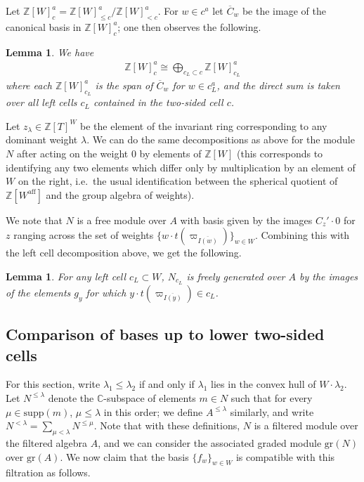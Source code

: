 \documentclass{amsart}
\newtheorem{lemma}[thm]{Lemma}
\theoremstyle{definition}
\begin{document}
Let $\mathbb{Z}[W]_{c}^a = \mathbb{Z}[W]_{\leq c}^a/\mathbb{Z}[W]_{< c}^a$. For $w \in c^a$ let $\overline{C}_w$ be the image of the canonical basis in $\mathbb{Z}[W]^a_c$; one then observes the following.

\begin{lemma}\label{lem:leftcell}
    We have
    \begin{align}
        \mathbb{Z}[W]_{c}^a \cong \bigoplus_{c_L \subset c} \mathbb{Z}[W]_{c_L}^a
    \end{align}
    where each $\mathbb{Z}[W]^a_{c_L}$ is the span of $\overline{C}_w$ for $w \in c_L^a$, and the direct sum is taken over all left cells $c_L$ contained in the two-sided cell $c$.
\end{lemma}

Let $z_{\lambda} \in \mathbb{Z}[T]^W$ be the element of the invariant ring corresponding to any dominant weight $\lambda$. We can do the same decompositions as above for the module $N$ after acting on the weight $0$ by elements of $\mathbb{Z}[W]$ (this corresponds to identifying any two elements which differ only by multiplication by an element of $W$ on the right, i.e.\ the usual identification between the spherical quotient of $\mathbb{Z}[W^{\mathrm{aff}}]$ and the group algebra of weights).

We note that $N$ is a free module over $A$ with basis given by the images $C_z' \cdot 0$ for $z$ ranging across the set of weights $\{w \cdot t(\varpi_{\overline{I(w)}})\}_{w \in W}$. Combining this with the left cell decomposition above, we get the following.
\begin{lemma}\label{lem:thetas}
    For any left cell $c_L \subset W$, $N_{c_L}$ is freely generated over $A$ by the images of the elements $g_y$ for which $y \cdot t(\varpi_{\overline{I(y)}}) \in c_L$. 
\end{lemma}

\subsection{Comparison of bases up to lower two-sided cells}
For this section, write $\lambda_1 \leq \lambda_2$ if and only if $\lambda_1$ lies in the convex hull of $W\cdot \lambda_2$. Let $N^{\leq \lambda}$ denote the $\mathbb{C}$-subspace of elements $m \in N$ such that for every $\mu \in \mathrm{supp}(m)$, $\mu \leq \lambda$ in this order; we define $A^{\leq \lambda}$ similarly, and write $N^{<\lambda} = \sum_{\mu < \lambda} N^{\leq \mu}$. Note that with these definitions, $N$ is a filtered module over the filtered algebra $A$, and we can consider the associated graded module $\mathrm{gr}(N)$ over $\mathrm{gr}(A)$. We now claim that the basis $\{f_w\}_{w \in W}$ is compatible with this filtration as follows.
\end{document}

